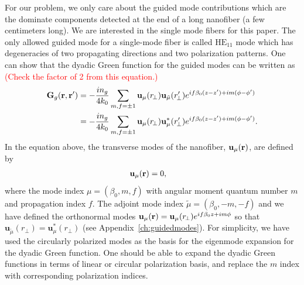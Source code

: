 \documentclass[preprint,aps,pra,onecolumn]{revtex4-1} %
\begin{document}
For our problem, we only care about the guided mode contributions which are the dominate components detected at the end of a long nanofiber (a few centimeters long). We are interested in the single mode fibers for this paper. The only allowed guided mode for a single-mode fiber is called \textit{$\mathrm{HE}_{11}$} mode which has degeneracies of two propagating directions and two polarization patterns. One can show that the dyadic Green function for the guided modes can be written as~\cite{Sondergaard2001a} \textcolor{red}{(Check the factor of 2 from this equation.)}
\begin{align}
\mathbf{G}_g(\mathbf{r},\mathbf{r}') &=-\frac{in_g}{4k_0} \sum_{m,f=\pm 1} \mathbf{u}_{\mu}(r\!_\perp)\mathbf{u}_{\tilde{\mu}}(r_{\!\perp}^\prime)e^{if\beta_0(z-z')+im(\phi-\phi')}\\
&= -\frac{in_g}{4k_0} \sum_{m,f=\pm 1} \mathbf{u}_{\mu}(r\!_\perp)\mathbf{u}^*_{\mu}(r_{\!\perp}^\prime)e^{if\beta_0(z-z')+im(\phi-\phi')}.
\end{align}
In the equation above, the transverse modes of the nanofiber, $\mathbf{u}_{\mu}(\mathbf{r})$, are defined by
\begin{align}
[-\nabla\times\nabla + \frac{\omega_{\mu}^2}{c^2}n^2(\br)]  \mathbf{u}_{\mu}(\br) &=0,
\end{align}
where the mode index $\mu=(\beta_0,m,f)$ with angular moment quantum number $ m $ and propagation index $ f $. The adjoint mode index $\tilde{\mu}=(\beta_0,-m,-f)$ and we have defined the orthonormal modes $\mathbf{u}_{\mu}(\mathbf{r})=\mathbf{u}_{\mu}(r_{\!\perp})e^{if\beta_0z+im\phi}$ so that $\mathbf{u}_{\tilde{\mu}}(r_{\!\perp})=\mathbf{u}^*_{\mu}(r_{\!\perp})$ (see Appendix~\ref{ch:guidedmodes}). For simplicity, we have used the circularly polarized modes as the basis for the eigenmode expansion for the dyadic Green function. One should be able to expand the dyadic Green functions in terms of linear or circular polarization basis, and replace the $m$ index with corresponding polarization indices. 
\end{document}
